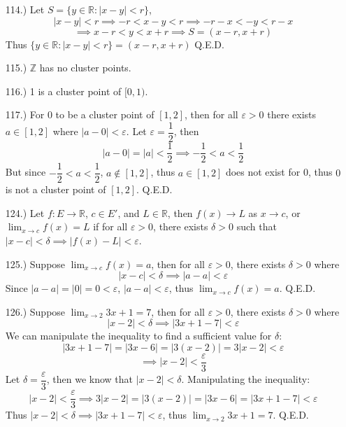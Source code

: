 \documentclass[12pt]{article}
\newcommand{\vertb}[1]{\left\vert#1\right\vert}
\newcommand{\e}{\varepsilon}
\newcommand{\lm}[1]{\displaystyle\lim_{#1}}
\begin{document}
\begin{itemize}
    \item [114.)] Let $S=\{y\in\mathbb{R}:\vertb{x-y}<r\}$,
    \[\vertb{x-y}<r\implies-r<x-y<r\implies -r-x<-y<r-x\]
    \[\implies x-r<y<x+r\implies S=(x-r,x+r)\]
    Thus $\{y\in\mathbb{R}:\vertb{x-y}<r\}=(x-r,x+r)$ Q.E.D.
    
    \item [115.)] $\mathbb{Z}$ has no cluster points.
    
    \item [116.)] 1 is a cluster point of $[0,1)$.

    \item [117.)] For $0$ to be a cluster point of $[1,2]$, then for all $\varepsilon>0$ there exists $a\in[1,2]$ where $\vertb{a-0}<\varepsilon$. Let $\varepsilon=\dfrac{1}{2}$, then
    \[\vertb{a-0}=\vertb{a}<\frac{1}{2}\implies -\frac{1}{2}<a<\frac{1}{2}\]
    But since $-\dfrac{1}{2}<a<\dfrac{1}{2}$, $a\notin[1,2]$, thus $a\in[1,2]$ does not exist for 0, thus $0$ is not a cluster point of $[1,2]$. Q.E.D.







    \item [124.)] Let $f:E\to\mathbb{R}$, $c\in E'$, and $L\in\mathbb{R}$, then $f(x)\to L$ as $x\to c$, or $\displaystyle\lim_{x\to c}f(x)=L$ if for all $\varepsilon>0$, there exists $\delta>0$ such that $\vertb{x-c}<\delta\implies\vertb{f(x)-L}<\varepsilon$.

    \item [125.)] Suppose $\displaystyle\lim_{x\to c}f(x)=a$, then for all $\varepsilon>0$, there exists $\delta>0$ where
    \[\vertb{x-c}<\delta\implies\vertb{a-a}<\varepsilon\]
    Since $\vertb{a-a}=\vertb{0}=0<\varepsilon$, $\vertb{a-a}<\varepsilon$, thus $\displaystyle\lim_{x\to c}f(x)=a$. Q.E.D.

    \item [126.)] Suppose $\lm{x\to2}3x+1=7$, then for all $\varepsilon>0$, there exists $\delta>0$ where
    \[\vertb{x-2}<\delta\implies\vertb{3x+1-7}<\e\]
    We can manipulate the inequality to find a sufficient value for $\delta$:
    \[\vertb{3x+1-7}=\vertb{3x-6}=\vertb{3(x-2)}=3\vertb{x-2}<\e\]
    \[\implies\vertb{x-2}<\frac{\e}{3}\]
    Let $\delta=\dfrac{\e}{3}$, then we know that $\vertb{x-2}<\delta$. Manipulating the inequality:
    \[\vertb{x-2}<\dfrac{\e}{3}\implies3\vertb{x-2}=\vertb{3(x-2)}=\vertb{3x-6}=\vertb{3x+1-7}<\e\]
    Thus $\vertb{x-2}<\delta\implies\vertb{3x+1-7}<\e$, thus $\lm{x\to2}3x+1=7$. Q.E.D.


\end{itemize}
\end{document}
